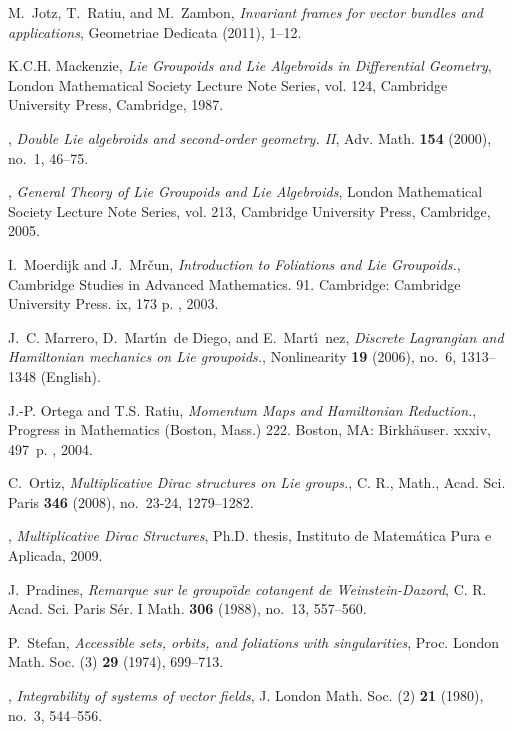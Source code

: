 \documentclass{amsart}
\theoremstyle{definition}
\begin{document}
\begin{thebibliography}{MMndDMn06}
M.~Jotz, T.~Ratiu, and M.~Zambon, \emph{Invariant frames for vector bundles and
  applications}, Geometriae Dedicata (2011), 1--12.

K.C.H. Mackenzie, \emph{Lie {G}roupoids and {L}ie {A}lgebroids in
  {D}ifferential {G}eometry}, London Mathematical Society Lecture Note Series,
  vol. 124, Cambridge University Press, Cambridge, 1987.

\bysame, \emph{Double {L}ie algebroids and second-order geometry. {II}}, Adv.
  Math. \textbf{154} (2000), no.~1, 46--75.

\bysame, \emph{General {T}heory of {L}ie {G}roupoids and {L}ie {A}lgebroids},
  London Mathematical Society Lecture Note Series, vol. 213, Cambridge
  University Press, Cambridge, 2005.

I.~Moerdijk and J.~Mr\v{c}un, \emph{{Introduction to {F}oliations and {L}ie
  {G}roupoids.}}, {Cambridge Studies in Advanced Mathematics. 91. Cambridge:
  Cambridge University Press. ix, 173 p. }, 2003.

J.~C. Marrero, D.~Mart\'\i n~de Diego, and E.~Mart\'\i~nez, \emph{{Discrete
  Lagrangian and Hamiltonian mechanics on Lie groupoids.}}, Nonlinearity
  \textbf{19} (2006), no.~6, 1313--1348 (English).

J.-P. Ortega and T.S. Ratiu, \emph{{Momentum {M}aps and {H}amiltonian
  {R}eduction.}}, {Progress in Mathematics (Boston, Mass.) 222. Boston, MA:
  Birkh\"auser. xxxiv, 497~p. }, 2004.

C.~Ortiz, \emph{{Multiplicative Dirac structures on Lie groups.}}, C. R.,
  Math., Acad. Sci. Paris \textbf{346} (2008), no.~23-24, 1279--1282.

\bysame, \emph{Multiplicative {D}irac {S}tructures}, Ph.D. thesis, Instituto de
  Matem\'atica Pura e Aplicada, 2009.

J.~Pradines, \emph{Remarque sur le groupo\"\i de cotangent de
  {W}einstein-{D}azord}, C. R. Acad. Sci. Paris S\'er. I Math. \textbf{306}
  (1988), no.~13, 557--560.

P.~Stefan, \emph{Accessible sets, orbits, and foliations with singularities},
  Proc. London Math. Soc. (3) \textbf{29} (1974), 699--713.

\bysame, \emph{Integrability of systems of vector fields}, J. London Math. Soc.
  (2) \textbf{21} (1980), no.~3, 544--556.


\end{thebibliography}
\end{document}
